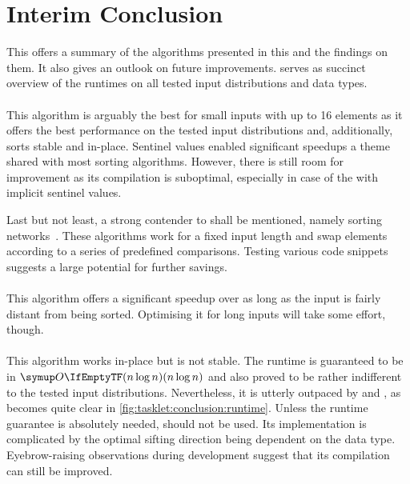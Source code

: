 \section{Interim Conclusion}
\label{sec:tasklet:conclusion}


This  offers a summary of the algorithms presented in this  and the findings on them.
It also gives an outlook on future improvements.
 serves as succinct overview of the runtimes on all tested input distributions and data types.


\paragraph{\IS{}}
This algorithm is arguably the best for small inputs with up to 16 elements as it offers the best performance on the tested input distributions and, additionally, sorts stable and in-place.
Sentinel values enabled significant speedups \Dash a theme shared with most sorting algorithms.
However, there is still room for improvement as its compilation is suboptimal, especially in case of the \IS{} with implicit sentinel values.

Last but not least, a strong contender to \IS{} shall be mentioned, namely sorting networks~\cites{codish2017sortingnetworks}[Chapter~13]{lang2009algorithmen}.
These algorithms work for a fixed input length and swap elements according to a series of predefined comparisons.
Testing various code snippets~\cites[9]{codish2017sortingnetworks}{m2015fastestway}{paulr2010fastestsort} suggests a large potential for further savings.


\paragraph{\ShS{}}
This  algorithm offers a significant speedup over \IS{} as long as the input is fairly distant from being sorted.
Optimising it for long inputs will take some effort, though.


\paragraph{\HS{}}
This algorithm works in-place but is not stable.
The runtime is guaranteed to be in \(\bigoh{n \log n}\) and also proved to be rather indifferent to the tested input distributions.
Nevertheless, it is utterly outpaced by \QS{} and \MS{}, as becomes quite clear in \cref{fig:tasklet:conclusion:runtime}.
Unless the runtime guarantee is absolutely needed, \HS{} should not be used.
Its implementation is complicated by the optimal sifting direction being dependent on the data type.
Eyebrow-raising observations during development suggest that its compilation can still be improved.

